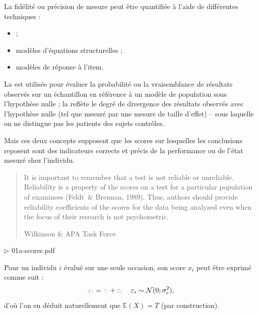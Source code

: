 
La fidélité ou précision de mesure peut être quantifiée à l'aide de différentes
techniques :
\begin{itemize}
\item {} ;
\item modèles d'équations structurelles ;
\item modèles de réponse à l'item.
\end{itemize}


La  est utilisée pour évaluer la
probabilité ou la vraisemblance de résultats observés sur un échantillon en
référence à un modèle de population sous l'hypothèse nulle ; la
 reflète le degré de divergence
des résultats observés avec l'hypothèse nulle (tel que mesuré par une mesure de
taille d'effet) -- sous laquelle on ne distingue pas les patients des sujets
contrôles\autocite{Thompson2003}.

Mais ces deux concepts supposent que les scores sur lesquelles les conclusions
reposent sont des indicateurs corrects et précis de la performance ou de l'état
mesuré chez l'individu.

\foilhead{}

\begin{quote}
It is important to remember that a test is not reliable or
unreliable. Reliability is a property of the scores on a test for a
particular population of examinees (Feldt~\& Brennan, 1989). Thus,
authors should provide reliability coefficients of the scores for the
data being analyzed even when the focus of their research is not
psychometric.

\raggedleft Wilkinson \& APA Task Force\autocite{Wilkinson1999}
\end{quote}


\hfill $\triangleright$ 01a-scores.pdf

Pour un individu $i$ évalué sur une seule occasion, son score $x_i$ peut être
exprimé comme suit : 
\[
\textcolor{CornflowerBlue}{x_i} = \textcolor{Apricot}{\tau_i} +
\textcolor{Thistle}{\varepsilon_i}\,\quad \varepsilon_i\sim\mathcal{N}(0;\sigma_e^2),
\]
d'où l'on en déduit naturellement que $\mathbb{E}(X)=T$ (par construction).

